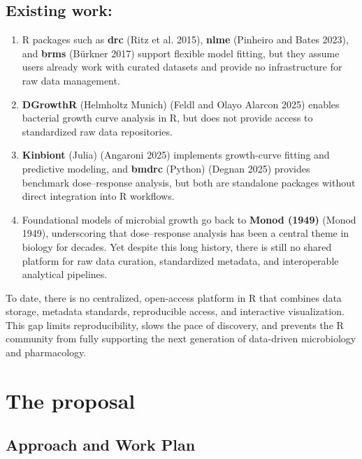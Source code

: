 \documentclass[
  letterpaper,
  DIV=11,
  numbers=noendperiod]{scrartcl}
\providecommand{\tightlist}{%
  \setlength{\itemsep}{0pt}\setlength{\parskip}{0pt}}
\begin{document}
\subsection{Existing work:}\label{existing-work}

\begin{enumerate}
\def\labelenumi{\arabic{enumi}.}
\tightlist
\item
  R packages such as \textbf{drc} (Ritz et al. 2015), \textbf{nlme}
  (Pinheiro and Bates 2023), and \textbf{brms} (Bürkner 2017) support
  flexible model fitting, but they assume users already work with
  curated datasets and provide no infrastructure for raw data
  management.
\item
  \textbf{DGrowthR} (Helmholtz Munich) (Feldl and Olayo Alarcon 2025)
  enables bacterial growth curve analysis in R, but does not provide
  access to standardized raw data repositories.
\item
  \textbf{Kinbiont} (Julia) (Angaroni 2025) implements growth-curve
  fitting and predictive modeling, and \textbf{bmdrc} (Python) (Degnan
  2025) provides benchmark dose--response analysis, but both are
  standalone packages without direct integration into R workflows.
\item
  Foundational models of microbial growth go back to \textbf{Monod
  (1949)} (Monod 1949), underscoring that dose--response analysis has
  been a central theme in biology for decades. Yet despite this long
  history, there is still no shared platform for raw data curation,
  standardized metadata, and interoperable analytical pipelines.
\end{enumerate}

To date, there is no centralized, open-access platform in R that
combines data storage, metadata standards, reproducible access, and
interactive visualization. This gap limits reproducibility, slows the
pace of discovery, and prevents the R community from fully supporting
the next generation of data-driven microbiology and pharmacology.

\section{The proposal}\label{the-proposal}

\subsection{Approach and Work Plan}\label{approach-and-work-plan}
\end{document}

